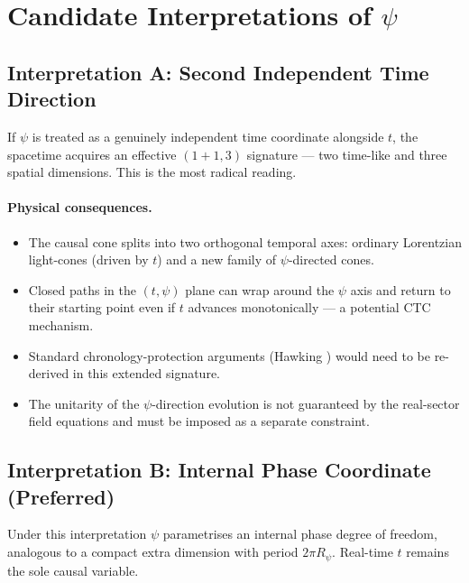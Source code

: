 \documentclass[12pt]{article}
\begin{document}
\section{Candidate Interpretations of $\psi$}
\subsection{Interpretation A: Second Independent Time Direction}

If $\psi$ is treated as a genuinely independent time coordinate alongside
$t$, the spacetime acquires an effective $(1+1,3)$ signature — two time-like
and three spatial dimensions.  This is the most radical reading.

\paragraph{Physical consequences.}
\begin{itemize}
  \item The causal cone splits into two orthogonal temporal axes: ordinary
    Lorentzian light-cones (driven by $t$) and a new family of
    $\psi$-directed cones.
  \item Closed paths in the $(t,\psi)$ plane can wrap around the $\psi$
    axis and return to their starting point even if $t$ advances
    monotonically — a potential CTC mechanism.
  \item Standard chronology-protection arguments (Hawking \cite{Hawking1992})
    would need to be re-derived in this extended signature.
  \item The unitarity of the $\psi$-direction evolution is not guaranteed
    by the real-sector field equations and must be imposed as a separate
    constraint.
\end{itemize}

\subsection{Interpretation B: Internal Phase Coordinate (Preferred)}

Under this interpretation $\psi$ parametrises an internal phase degree of
freedom, analogous to a compact extra dimension with period $2\pi R_\psi$.
Real-time $t$ remains the sole causal variable.
\end{document}
